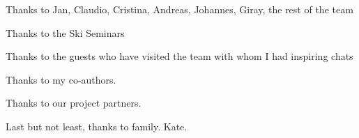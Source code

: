 %
%



Thanks to Jan, 
Claudio,
Cristina,
Andreas,
Johannes,
Giray, 
the rest of the team

Thanks to the Ski Seminars

Thanks to the guests who have visited the team with whom I had inspiring chats

Thanks to my co-authors.

Thanks to our project partners.

Last but not least, thanks to family. Kate.

